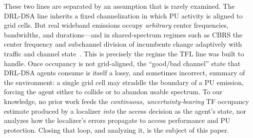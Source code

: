 These two lines are separated by an assumption that is rarely examined. The
DRL-DSA line inherits a fixed channelization in which PU activity is aligned
to grid cells. But real wideband emissions occupy \emph{arbitrary} center
frequencies, bandwidths, and durations---and in shared-spectrum regimes such
as CBRS the center frequency and subchannel division of incumbents change
adaptively with traffic and channel state~\cite{sohul2015cbrs,zhao2025trtfl_ssl}.
This is precisely the regime the TFL line was built to handle. Once occupancy
is not grid-aligned, the ``good/bad channel'' state that DRL-DSA agents
consume is itself a lossy, and sometimes incorrect, summary of the
environment: a single grid cell may straddle the boundary of a PU emission,
forcing the agent either to collide or to abandon usable spectrum. To our
knowledge, no prior work feeds the \emph{continuous, uncertainty-bearing} TF
occupancy estimate produced by a localizer \emph{into} the access decision as
the agent's state, nor analyzes how the localizer's errors propagate to access
performance and PU protection. Closing that loop, and analyzing it, is the
subject of this paper.

